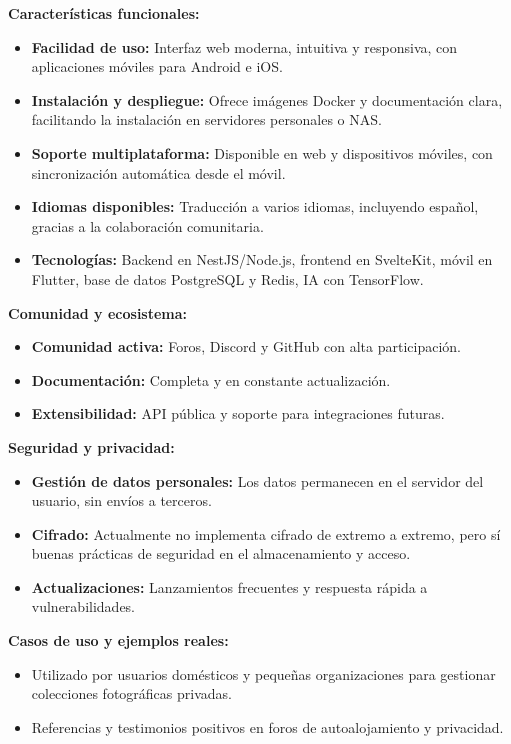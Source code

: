 \textbf{Características funcionales:}
\begin{itemize}
    \item \textbf{Facilidad de uso:} Interfaz web moderna, intuitiva y responsiva, con aplicaciones móviles para Android e iOS.
    \item \textbf{Instalación y despliegue:} Ofrece imágenes Docker y documentación clara, facilitando la instalación en servidores personales o NAS.
    \item \textbf{Soporte multiplataforma:} Disponible en web y dispositivos móviles, con sincronización automática desde el móvil.
    \item \textbf{Idiomas disponibles:} Traducción a varios idiomas, incluyendo español, gracias a la colaboración comunitaria.
    \item \textbf{Tecnologías:} Backend en NestJS/Node.js, frontend en SvelteKit, móvil en Flutter, base de datos PostgreSQL y Redis, IA con TensorFlow.
\end{itemize}

\textbf{Comunidad y ecosistema:}
\begin{itemize}
    \item \textbf{Comunidad activa:} Foros, Discord y GitHub con alta participación.
    \item \textbf{Documentación:} Completa y en constante actualización.
    \item \textbf{Extensibilidad:} API pública y soporte para integraciones futuras.
\end{itemize}

\textbf{Seguridad y privacidad:}
\begin{itemize}
    \item \textbf{Gestión de datos personales:} Los datos permanecen en el servidor del usuario, sin envíos a terceros.
    \item \textbf{Cifrado:} Actualmente no implementa cifrado de extremo a extremo, pero sí buenas prácticas de seguridad en el almacenamiento y acceso.
    \item \textbf{Actualizaciones:} Lanzamientos frecuentes y respuesta rápida a vulnerabilidades.
\end{itemize}

\textbf{Casos de uso y ejemplos reales:}
\begin{itemize}
    \item Utilizado por usuarios domésticos y pequeñas organizaciones para gestionar colecciones fotográficas privadas.
    \item Referencias y testimonios positivos en foros de autoalojamiento y privacidad.
\end{itemize}

